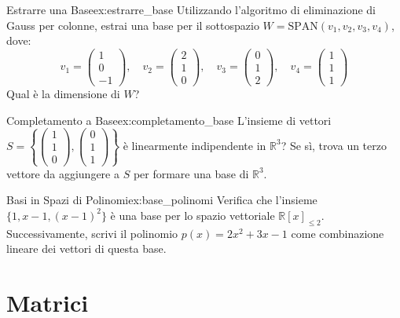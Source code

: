 \documentclass{article}
\begin{document}
\begin{exercise}{Estrarre una Base}{ex:estrarre_base}
    Utilizzando l'algoritmo di eliminazione di Gauss per colonne, estrai una base per il sottospazio $W = \text{SPAN}(v_1, v_2, v_3, v_4)$, dove:
    \[ v_1 = \begin{pmatrix} 1 \\ 0 \\ -1 \end{pmatrix}, \quad v_2 = \begin{pmatrix} 2 \\ 1 \\ 0 \end{pmatrix}, \quad v_3 = \begin{pmatrix} 0 \\ 1 \\ 2 \end{pmatrix}, \quad v_4 = \begin{pmatrix} 1 \\ 1 \\ 1 \end{pmatrix} \]
    Qual è la dimensione di $W$?
\end{exercise}

\begin{exercise}{Completamento a Base}{ex:completamento_base}
    L'insieme di vettori $S = \left\{ \begin{pmatrix} 1 \\ 1 \\ 0 \end{pmatrix}, \begin{pmatrix} 0 \\ 1 \\ 1 \end{pmatrix} \right\}$ è linearmente indipendente in $\mathbb{R}^3$? Se sì, trova un terzo vettore da aggiungere a $S$ per formare una base di $\mathbb{R}^3$.
\end{exercise}

\begin{exercise}{Basi in Spazi di Polinomi}{ex:base_polinomi}
    Verifica che l'insieme $\{1, x-1, (x-1)^2\}$ è una base per lo spazio vettoriale $\mathbb{R}[x]_{\le 2}$. Successivamente, scrivi il polinomio $p(x) = 2x^2 + 3x - 1$ come combinazione lineare dei vettori di questa base.
\end{exercise}

\section{Matrici}
\end{document}
